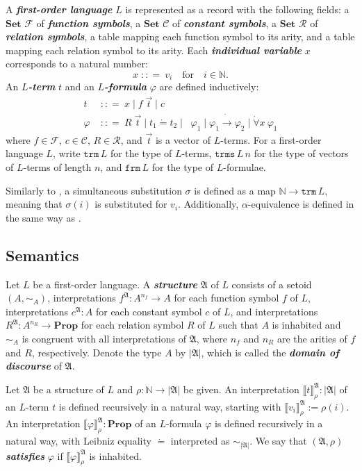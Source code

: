 \documentclass[twocolumn]{article}
\theoremstyle{definition}
\theoremstyle{definition}
\theoremstyle{definition}
\theoremstyle{definition}
\theoremstyle{definition}
\theoremstyle{definition}
\theoremstyle{definition}
\newcommand{\inlinedef}[1]{\emph{\textbf{#1}}}
\newcommand{\IN}{\mathbb{N}}
\newcommand{\0}{\texttt{0}}
\newcommand{\1}{\texttt{1}}
\newcommand{\Prop}{\mathbf{Prop}}
\newcommand{\Set}{\mathbf{Set}}
\newcommand{\bnfis}{\mathrel{\;{:}{:}{=}\ }}
\newcommand{\bnfor}{\mathrel{\;\big|\; }}
\newcommand{\Leq}{\mathrel{\dot{=}}}
\newcommand{\Lneg}{\mathop{\dot{\neg}}}
\newcommand{\Lto}{\mathrel{\dot{\to}}}
\newcommand{\Lall}[1]{\dot{\forall}#1\ }
\begin{document}
A \inlinedef{first-order language} $L$ is represented as a record with the following fields:
a $\Set$ $\mathcal{F}$ of \inlinedef{function symbols},
a $\Set$ $\mathcal{C}$ of \inlinedef{constant symbols},
a $\Set$ $\mathcal{R}$ of \inlinedef{relation symbols},
a table mapping each function symbol to its arity, and
a table mapping each relation symbol to its arity.
Each \inlinedef{individual variable} $x$ corresponds to a natural number:
\[x \bnfis v_i \quad \mathrm{for} \quad i \in \IN . \]
An \inlinedef{$L$-term} $t$ and an \inlinedef{$L$-formula} $\varphi$ are defined inductively:
\begin{align*}
t &\bnfis x \bnfor f \; \vec{t} \bnfor c \\
\varphi &\bnfis R \; \vec{t} \bnfor t_1 \Leq t_2 \bnfor \Lneg \varphi_1 \bnfor \varphi_1 \Lto \varphi_2 \bnfor \Lall{x} \varphi_1
\end{align*}
where $f \in \mathcal{F}$, $c \in \mathcal{C}$, $R \in \mathcal{R}$,
and $\vec{t}$ is a vector of $L$-terms.
For a first-order language $L$,
write $\mathtt{trm} \, L$ for the type of $L$-terms,
$\mathtt{trms} \, L \, n$ for the type of vectors of $L$-terms of length $n$, and
$\mathtt{frm} \, L$ for the type of $L$-formulae.

Similarly to \cite{copello2017},
a simultaneous substitution $\sigma$ is defined as a map $\IN \to \mathtt{trm} \, L$,
meaning that $\sigma (i)$ is substituted for $v_i$.
Additionally, $\alpha$-equivalence is defined in the same way as \cite{copello2017}.

\subsection{Semantics}
\label{ss:Semantics}

Let $L$ be a first-order language.
A \inlinedef{structure} $\mathfrak{A}$ of $L$ consists of a setoid $\left( A , \sim_A \right)$,
interpretations $f^\mathfrak{A} : A^{n_f} \to A$ for each function symbol $f$ of $L$,
interpretations $c^\mathfrak{A} : A$ for each constant symbol $c$ of $L$, and
interpretations $R^\mathfrak{A} : A^{n_R} \to \Prop$ for each relation symbol $R$ of $L$
such that $A$ is inhabited and
$\sim_A$ is congruent with all interpretations of $\mathfrak{A}$,
where $n_f$ and $n_R$ are the arities of $f$ and $R$, respectively.
Denote the type $A$ by $| \mathfrak{A} |$,
which is called the \inlinedef{domain of discourse} of $\mathfrak{A}$.

Let $\mathfrak{A}$ be a structure of $L$ and $\rho : \IN \to | \mathfrak{A} |$ be given.
An interpretation $\llbracket t \rrbracket_\rho^\mathfrak{A} : | \mathfrak{A} |$ of an $L$-term $t$ is defined recursively in a natural way,
starting with $\llbracket v_i \rrbracket_\rho^\mathfrak{A} := \rho \left( i \right)$.
An interpretation $\llbracket \varphi \rrbracket_\rho^\mathfrak{A} : \Prop$ of an $L$-formula $\varphi$ is defined recursively in a natural way,
with Leibniz equality $\Leq$ interpreted as $\sim_{|\mathfrak{A}|}$.
We say that $( \mathfrak{A} , \rho )$ \inlinedef{satisfies} $\varphi$ if $\llbracket \varphi \rrbracket_\rho^\mathfrak{A}$ is inhabited.
\end{document}
